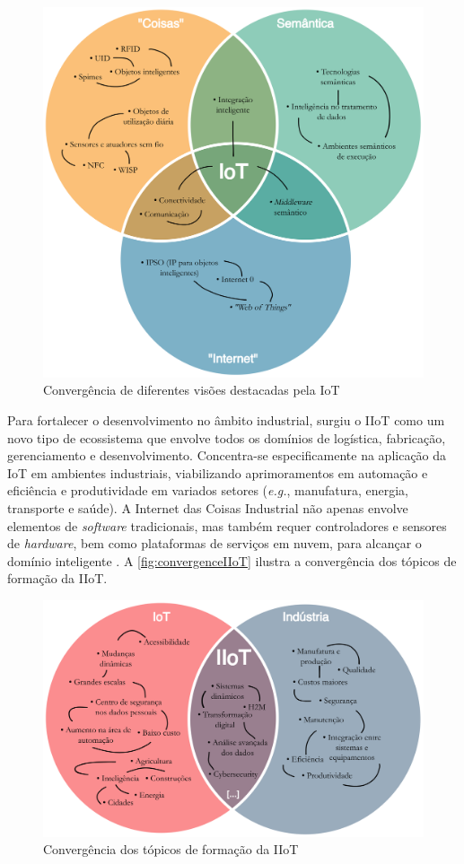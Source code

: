     \begin{figure}[htbp]
        \caption{Convergência de diferentes visões destacadas pela IoT}
        \label{fig:convergenceIoT}
        \begin{center}
            \includegraphics[width=0.7\linewidth]{USPSC-img/convergenceIoT2.png}
        \end{center}
    \end{figure}
    
    Para fortalecer o desenvolvimento no âmbito industrial, surgiu o IIoT como um novo tipo de ecossistema que envolve todos os domínios de logística, fabricação, gerenciamento e desenvolvimento. Concentra-se especificamente na aplicação da IoT em ambientes industriais, viabilizando aprimoramentos em automação e eficiência e produtividade em variados setores (\textit{e.g.}, manufatura, energia, transporte e saúde). A Internet das Coisas Industrial não apenas envolve elementos de \textit{software} tradicionais, mas também requer controladores e sensores de \textit{hardware}, bem como plataformas de serviços em nuvem, para alcançar o domínio inteligente \cite{huichao2020}. A \autoref{fig:convergenceIIoT} ilustra a convergência dos tópicos de formação da IIoT.

    \begin{figure}[htbp]
        \caption{Convergência dos tópicos de formação da IIoT}
        \label{fig:convergenceIIoT}
        \begin{center}
            \includegraphics[width=0.7\linewidth]{USPSC-img/convergenceIIoT2.png}
        \end{center}
    \end{figure}
    
